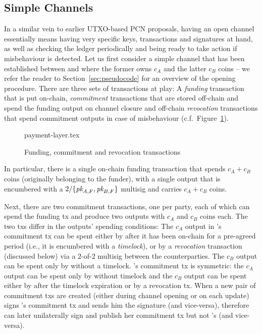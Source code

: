 \subsection{Simple Channels}
  In a similar vein to earlier UTXO-based PCN proposals, having an open channel essentially
  means having very specific keys, transactions and signatures at hand, as well
  as checking the ledger periodically and being ready to take action if
  misbehaviour is detected. Let us first consider a simple channel that has been
  established between \alice and \bob where the former owns $c_A$ and the latter
  $c_B$ coins -- we refer the reader to Section~\ref{sec:pseudocode} for an
  overview of the opening procedure. There are
  three sets of transactions at play: A \emph{funding}
  transaction that is put on-chain, \emph{commitment} transactions that are stored
  off-chain and
  spend the funding output on channel closure and off-chain \emph{revocation}
  transactions that spend commitment outputs in case of misbehaviour (c.f.\
  Figure~\ref{figure:payment-layer}).

  \begin{figure}
    \centering
    {payment-layer.tex}
    \caption{Funding, commitment and revocation transactions}
    \label{figure:payment-layer}
  \end{figure}

  In particular, there is a single on-chain funding transaction that spends $c_A
  + c_B$ coins (originally belonging to the funder), with a single output that is encumbered with a
  $2/\{\textit{pk}_{A, F}, \textit{pk}_{B, F}\}$ multisig and carries $c_A + c_B$ coins.

  Next, there are two commitment transactions, one per party, each of which can spend the
  funding tx and produce two outputs with $c_A$ and $c_B$ coins each. The two
  txs differ in the outputs' spending conditions: The $c_A$ output in \alice's
  commitment tx can be spent either by \alice after it has been on-chain for a
  pre-agreed period (i.e., it is encumbered with a \emph{timelock}), or by a
  \emph{revocation} transaction (discussed below) via a $2$-of-$2$ multisig between
  the counterparties. The $c_B$ output can be spent only by \bob without
  a timelock. \bob's commitment tx is symmetric: the $c_A$ output can be spent
  only by \alice without timelock and the $c_B$ output can be spent either by
  \bob after the timelock expiration or by a revocation tx. When a new pair of
  commitment txs are created (either during channel opening or on each update)
  \alice signs \bob's commitment tx and sends him the signature (and
  vice-versa), therefore \alice can later unilaterally sign and publish her commitment
  tx but not \bob's (and vice-versa).

